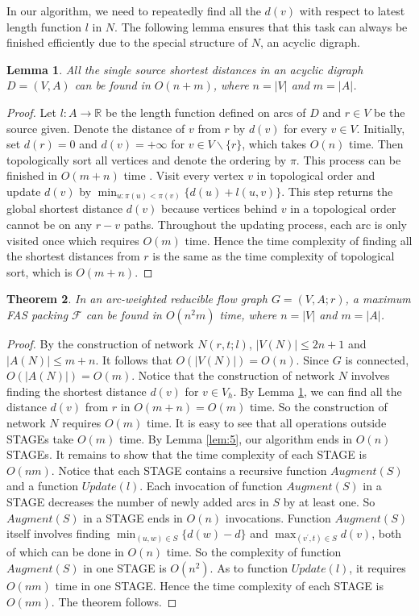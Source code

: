 \documentclass[11pt]{article}
\newtheorem{theorem}{Theorem}[section]
\newtheorem{lemma}[theorem]{Lemma}
\begin{document}
In our algorithm, we need to repeatedly find all the $d(v)$ with respect to latest length function $l$ in $N$. The following lemma ensures that this task can always be finished efficiently due to the special structure of $N$, an acyclic digraph.

\begin{lemma}
\label{lem:6}
All the single source shortest distances in an acyclic digraph $D=(V,A)$ can be found in $O(n+m)$, where $n=\lvert V \rvert$ and $m=\lvert A \rvert$.
\end{lemma}
\begin{proof}
Let $l:A\rightarrow \mathbb{R}$ be the length function defined on arcs of $D$ and $r\in V$ be the source given. Denote the distance of $v$ from $r$ by $d(v)$ for every $v\in V$. Initially, set $d(r)=0$ and $d(v)=+\infty$ for $v\in V\backslash \{r\}$, which takes $O(n)$ time. Then topologically sort all vertices and denote the ordering by $\pi$. This process can be finished in $O(m+n)$ time \cite{AhMO}. Visit every vertex $v$ in topological order and update $d(v)$ by $\min_{u:\pi(u)<\pi(v)}\{d(u)+l(u,v)\}$. This step returns the global shortest distance $d(v)$ because vertices behind $v$ in a topological order cannot be on any $r-v$ paths. Throughout the updating process, each arc is only visited once which requires $O(m)$ time. Hence the time complexity of finding all the shortest distances from $r$ is the same as the time complexity of topological sort, which is $O(m+n)$.
\end{proof}

\begin{theorem}
\label{thm:5}
In an arc-weighted reducible flow graph $G=(V,A;r)$, a maximum FAS packing $\mathcal{F}$ can be found in $O(n^2 m)$ time, where $n=\lvert V \rvert$ and $m=\lvert A \rvert$.
\end{theorem}
\begin{proof}
By the construction of network $N(r,t;l)$, $\lvert V(N)\rvert\leq 2n+1$ and $\lvert A(N)\rvert\leq m+n$. It follows that $O(\lvert V(N)\rvert)=O(n)$. Since $G$ is connected, $O(\lvert A(N)\rvert)=O(m)$. Notice that the construction of network $N$ involves finding the shortest distance $d(v)$ for $v\in V_h$. By Lemma \ref{lem:6}, we can find all the distance $d(v)$ from $r$ in $O(m+n)=O(m)$ time. So the construction of network $N$ requires $O(m)$ time. It is easy to see that all operations outside STAGEs take $O(m)$ time. By Lemma \ref{lem:5}, our algorithm ends in $O(n)$ STAGEs. It remains to show that the time complexity of each STAGE is $O(nm)$. Notice that each STAGE contains a recursive function $Augment(S)$ and a function $Update(l)$. Each invocation of function $Augment(S)$ in a STAGE decreases the number of newly added arcs in $S$ by at least one. So $Augment(S)$ in a STAGE ends in $O(n)$ invocations. Function $Augment(S)$ itself involves finding $\min_{(u,w)\in S}\{d(w)-d\}$ and $\max_{(v^\prime,t)\in S} d(v)$, both of which can be done in $O(n)$ time. So the complexity of function $Augment(S)$ in one STAGE is $O(n^2)$. As to function $Update(l)$, it requires $O(nm)$ time in one STAGE. Hence the time complexity of each STAGE is $O(nm)$. The theorem follows.
\end{proof}
\end{document}
